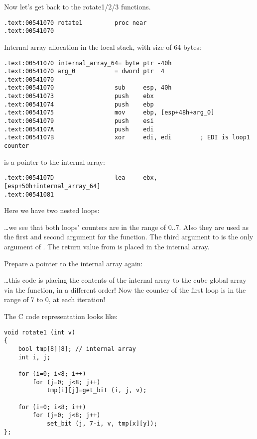 Now let's get back to the rotate1/2/3 functions.

\begin{lstlisting}[style=customasmx86]
.text:00541070 rotate1         proc near
.text:00541070
\end{lstlisting}

Internal array allocation in the local stack, with size of 64 bytes:

\begin{lstlisting}[style=customasmx86]
.text:00541070 internal_array_64= byte ptr -40h
.text:00541070 arg_0           = dword ptr  4
.text:00541070
.text:00541070                 sub     esp, 40h
.text:00541073                 push    ebx
.text:00541074                 push    ebp
.text:00541075                 mov     ebp, [esp+48h+arg_0]
.text:00541079                 push    esi
.text:0054107A                 push    edi
.text:0054107B                 xor     edi, edi        ; EDI is loop1 counter
\end{lstlisting}

\EBX is a pointer to the internal array:

\begin{lstlisting}[style=customasmx86]
.text:0054107D                 lea     ebx, [esp+50h+internal_array_64]
.text:00541081
\end{lstlisting}

Here we have two nested loops:



\dots we see that both loops' counters are in the range of 0..7. 
Also they are used as the first and second argument for the  function.
The third argument to  is the only argument of . 
The return value from  is placed in the internal array.

Prepare a pointer to the internal array again:



\dots this code is placing the contents of the internal array to the cube global array via the  function, 
 in a different order!
Now the counter of the first loop is in the range of 7 to 0,  at each iteration!

The C code representation looks like:

\begin{lstlisting}[style=customc]
void rotate1 (int v)
{
	bool tmp[8][8]; // internal array
	int i, j;

	for (i=0; i<8; i++)
		for (j=0; j<8; j++)
			tmp[i][j]=get_bit (i, j, v);

	for (i=0; i<8; i++)
		for (j=0; j<8; j++)
			set_bit (j, 7-i, v, tmp[x][y]);
};
\end{lstlisting}

